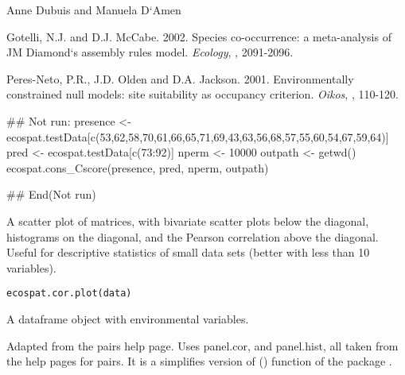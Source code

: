 \documentclass[a4paper]{book}
\begin{document}
%
\begin{Author}\relax
Anne Dubuis  and Manuela D`Amen 
\end{Author}
%
\begin{References}\relax
Gotelli, N.J. and D.J. McCabe. 2002. Species co-occurrence: a meta-analysis of JM Diamond`s assembly rules model. \emph{Ecology}, , 2091-2096.

Peres-Neto, P.R., J.D. Olden and D.A. Jackson. 2001. Environmentally constrained null models: site suitability as occupancy criterion. \emph{Oikos}, , 110-120.

\end{References}
%
\begin{Examples}
\begin{ExampleCode}
## Not run: 
presence <- ecospat.testData[c(53,62,58,70,61,66,65,71,69,43,63,56,68,57,55,60,54,67,59,64)]
pred <- ecospat.testData[c(73:92)]
nperm <- 10000
outpath <- getwd()
ecospat.cons_Cscore(presence, pred, nperm, outpath)

## End(Not run)
\end{ExampleCode}
\end{Examples}
%
\begin{Description}\relax
A scatter plot of matrices, with bivariate scatter plots below the diagonal, histograms on the diagonal, and the Pearson correlation above the diagonal. Useful for descriptive statistics of small data sets (better with less than 10 variables).
\end{Description}
%
\begin{Usage}
\begin{verbatim}
ecospat.cor.plot(data)
\end{verbatim}
\end{Usage}
%
\begin{Arguments}
\begin{ldescription}
\item[\code{data}] A dataframe object with environmental variables.
\end{ldescription}
\end{Arguments}
%
\begin{Details}\relax
Adapted from the pairs help page. Uses panel.cor, and panel.hist, all taken from the help pages for pairs. It is a simplifies version of () function of the package .
\end{Details}
\end{document}
